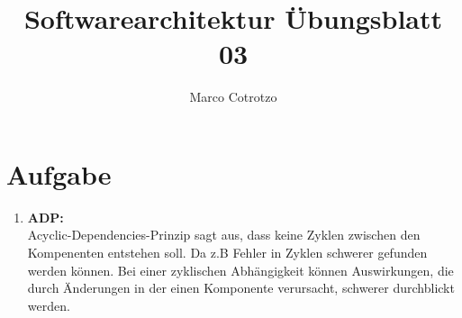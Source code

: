 \documentclass[]{article}
\title{Softwarearchitektur Übungsblatt 03}
\author{Marco Cotrotzo}
\date{}
\begin{document}
	\maketitle


\section{Aufgabe}
\renewcommand{\labelenumi}{\alph{enumi})}
\begin{enumerate}
\item

\textbf{ADP:}\\Acyclic-Dependencies-Prinzip sagt aus, dass keine Zyklen zwischen den Kompenenten entstehen soll. Da z.B Fehler in Zyklen schwerer gefunden werden können. Bei einer zyklischen Abhängigkeit können Auswirkungen, die durch Änderungen in der einen Komponente verursacht, schwerer durchblickt werden. \\


\end{enumerate}
\end{document}
